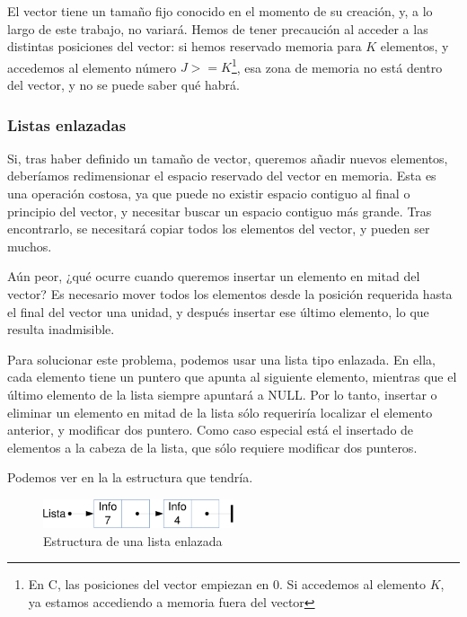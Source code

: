 El vector tiene un tamaño fijo conocido en el momento de su creación, y, a lo largo de este trabajo, no variará. Hemos 
de tener precaución al acceder a las distintas posiciones del vector: si hemos reservado memoria para $K$ elementos, y 
accedemos al elemento número $J>=K$\footnote{En C, las posiciones del vector empiezan en 0. Si accedemos al elemento 
$K$, ya estamos accediendo a memoria fuera del vector}, esa zona de memoria no está dentro del vector, y no se puede 
saber qué habrá.

\subsubsection{Listas enlazadas}
Si, tras haber definido un tamaño de vector, queremos añadir nuevos elementos, deberíamos redimensionar el espacio 
reservado del vector en memoria. Esta es una operación costosa, ya que puede no existir espacio contiguo al final o 
principio del vector, y necesitar buscar un espacio contiguo más grande. Tras encontrarlo, se necesitará copiar todos 
los elementos del vector, y pueden ser muchos.

Aún peor, ¿qué ocurre cuando queremos insertar un elemento en mitad del vector? Es necesario mover todos los elementos 
desde la posición requerida hasta el final del vector una unidad, y después insertar ese último elemento, lo que 
resulta inadmisible.

Para solucionar este problema, podemos usar una lista tipo enlazada. En ella, cada elemento tiene un puntero que apunta 
al siguiente elemento, mientras que el último elemento de la lista siempre apuntará a NULL. Por lo tanto, insertar o 
eliminar un elemento en mitad de la lista sólo requeriría localizar el elemento anterior, y modificar dos puntero. Como 
caso especial está el insertado de elementos a la cabeza de la lista, que sólo requiere modificar dos punteros.

Podemos ver en la  la estructura que tendría.

\begin{figure}[htbp]
\centering
\includegraphics[width=0.5\textwidth]{CapituloEstructura/Figuras/EstructuraListaEnlazada-crop}
\caption{Estructura de una lista enlazada}
\end{figure}
%

